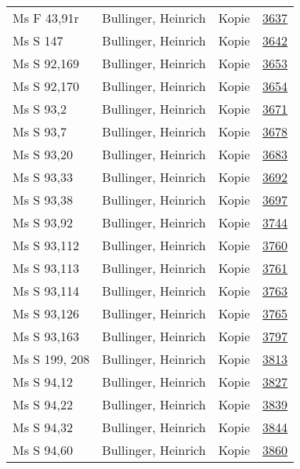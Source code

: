 \documentclass[10pt,a4paper,landscape]{report}
\begin{document}
\begin{longtable}{p{16cm}p{4cm}lr}
Ms F 43,91r	&	Bullinger, Heinrich	&	Kopie	&	\href{http://130.60.24.72/assignment/3637}{3637}\\
Ms S 147	&	Bullinger, Heinrich	&	Kopie	&	\href{http://130.60.24.72/assignment/3642}{3642}\\
Ms S 92,169	&	Bullinger, Heinrich	&	Kopie	&	\href{http://130.60.24.72/assignment/3653}{3653}\\
Ms S 92,170	&	Bullinger, Heinrich	&	Kopie	&	\href{http://130.60.24.72/assignment/3654}{3654}\\
Ms S 93,2	&	Bullinger, Heinrich	&	Kopie	&	\href{http://130.60.24.72/assignment/3671}{3671}\\
Ms S 93,7	&	Bullinger, Heinrich	&	Kopie	&	\href{http://130.60.24.72/assignment/3678}{3678}\\
Ms S 93,20	&	Bullinger, Heinrich	&	Kopie	&	\href{http://130.60.24.72/assignment/3683}{3683}\\
Ms S 93,33	&	Bullinger, Heinrich	&	Kopie	&	\href{http://130.60.24.72/assignment/3692}{3692}\\
Ms S 93,38	&	Bullinger, Heinrich	&	Kopie	&	\href{http://130.60.24.72/assignment/3697}{3697}\\
Ms S 93,92	&	Bullinger, Heinrich	&	Kopie	&	\href{http://130.60.24.72/assignment/3744}{3744}\\
Ms S 93,112	&	Bullinger, Heinrich	&	Kopie	&	\href{http://130.60.24.72/assignment/3760}{3760}\\
Ms S 93,113	&	Bullinger, Heinrich	&	Kopie	&	\href{http://130.60.24.72/assignment/3761}{3761}\\
Ms S 93,114	&	Bullinger, Heinrich	&	Kopie	&	\href{http://130.60.24.72/assignment/3763}{3763}\\
Ms S 93,126	&	Bullinger, Heinrich	&	Kopie	&	\href{http://130.60.24.72/assignment/3765}{3765}\\
Ms S 93,163	&	Bullinger, Heinrich	&	Kopie	&	\href{http://130.60.24.72/assignment/3797}{3797}\\
Ms S 199, 208	&	Bullinger, Heinrich	&	Kopie	&	\href{http://130.60.24.72/assignment/3813}{3813}\\
Ms S 94,12	&	Bullinger, Heinrich	&	Kopie	&	\href{http://130.60.24.72/assignment/3827}{3827}\\
Ms S 94,22	&	Bullinger, Heinrich	&	Kopie	&	\href{http://130.60.24.72/assignment/3839}{3839}\\
Ms S 94,32	&	Bullinger, Heinrich	&	Kopie	&	\href{http://130.60.24.72/assignment/3844}{3844}\\
Ms S 94,60	&	Bullinger, Heinrich	&	Kopie	&	\href{http://130.60.24.72/assignment/3860}{3860}\\

\end{longtable}
\end{document}

